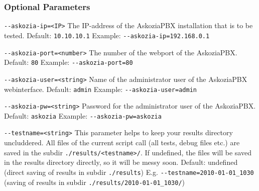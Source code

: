 \subsubsection{Optional Parameters}%
\begin{description}

\item {\texttt{-{}-askozia-ip=<IP>}} \newline
The IP-address of the AskoziaPBX installation that is to be tested.
\newline Default: \texttt{10.10.10.1}
\newline Example: \texttt{-{}-askozia-ip=192.168.0.1}

\item {\texttt{-{}-askozia-port=<number>}} \newline
The number of the webport of the AskoziaPBX.
\newline Default: \texttt{80}
\newline Example: \texttt{-{}-askozia-port=80}

\item {\texttt{-{}-askozia-user=<string>}} \newline
Name of the administrator user of the AskoziaPBX webinterface.
\newline Default: \texttt{admin}
\newline Example: \texttt{-{}-askozia-user=admin}

\item {\texttt{-{}-askozia-pw=<string>}} \newline
Password for the administrator user of the AskoziaPBX.
\newline Default: \texttt{askozia}
\newline Example: \texttt{-{}-askozia-pw=askozia}

\item {\texttt{-{}-testname=<string>}} \newline
This parameter helps to keep your results directory uncluddered. All files of the
current script call (all tests, debug files etc.) are saved in the subdir \newline
\texttt{./results/<testname>/}. If undefined, the files will be saved in the
results directory directly, so it will be messy soon.
\newline Default: undefined (direct saving of results in subdir \texttt{./results})
\newline E.g. \texttt{-{}-testname=2010-01-01\_1030}
\newline (saving of results in subdir \texttt{./results/2010-01-01\_1030/})


\end{description}
